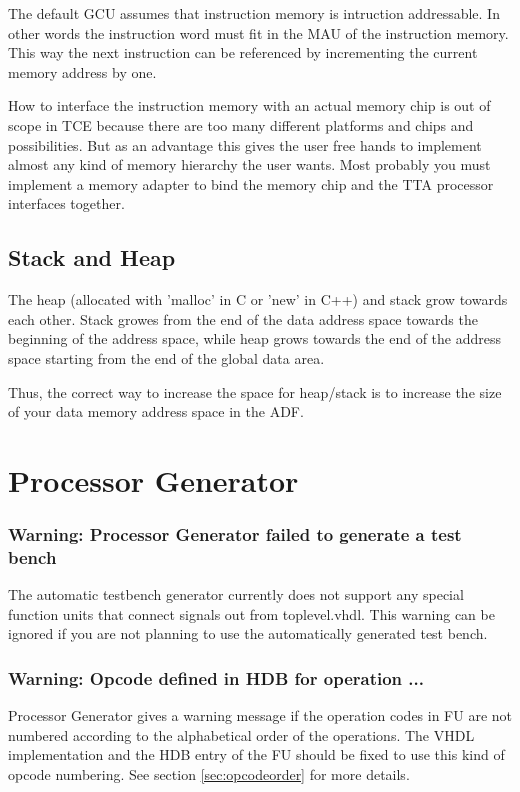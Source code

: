 \documentclass[twoside]{tceusermanual}
\begin{document}
The default GCU assumes that instruction memory is intruction addressable. In
other words the instruction word must fit in the MAU of the instruction
memory. This way the next instruction can be referenced by incrementing the
current memory address by one.

How to interface the instruction memory with an actual memory chip is out of
scope in TCE because there are too many different platforms and chips and
possibilities. But as an advantage this gives the user free hands to
implement almost any kind of memory hierarchy the user wants. Most probably
you must implement a memory adapter to bind the memory chip and the TTA
processor interfaces together.

\subsection{Stack and Heap}

The heap (allocated with 'malloc' in C or 'new' in C++) and stack grow 
towards each other. Stack growes from the end of the data address space 
towards the beginning of the address space, while heap grows towards 
the end of the address space starting from the end of the global data area.

Thus, the correct way to increase the space for heap/stack is to increase
the size of your data memory address space in the ADF. 

\section{Processor Generator}

\subsubsection{Warning: Processor Generator failed to generate a test bench}
The automatic testbench generator currently does not support any special
function units that connect signals out from toplevel.vhdl. This warning
can be ignored if you are not planning to use the automatically generated
test bench.

\subsubsection{Warning: Opcode defined in HDB for operation ...}

Processor Generator gives a warning message if the operation codes in FU
are not numbered according to the alphabetical order of the operations.
The VHDL implementation and the HDB entry of the FU should be fixed to use 
this kind of opcode numbering. See section \ref{sec:opcodeorder} for more 
details.
\end{document}
